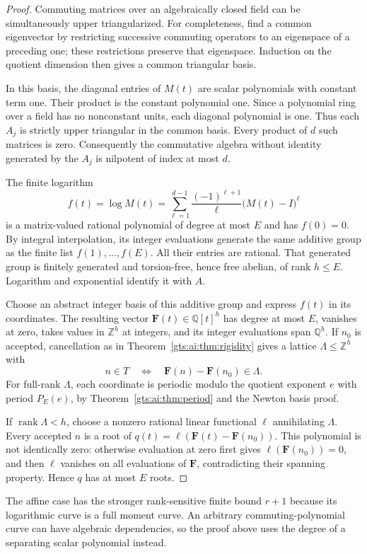 \documentclass[11pt,letterpaper]{article}
\theoremstyle{definition}
\theoremstyle{remark}
\newcommand{\Z}{\mathbb Z}
\newcommand{\rank}{\operatorname{rank}}
\newcommand{\Q}{\mathbb Q}
\begin{document}
\begin{proof}
Commuting matrices over an algebraically closed field can be simultaneously upper triangularized. For completeness, find a common eigenvector by restricting successive commuting operators to an eigenspace of a preceding one; these restrictions preserve that eigenspace. Induction on the quotient dimension then gives a common triangular basis.

In this basis, the diagonal entries of $M(t)$ are scalar polynomials with constant term one. Their product is the constant polynomial one. Since a polynomial ring over a field has no nonconstant units, each diagonal polynomial is one. Thus each $A_j$ is strictly upper triangular in the common basis. Every product of $d$ such matrices is zero. Consequently the commutative algebra without identity generated by the $A_j$ is nilpotent of index at most $d$.

The finite logarithm
\[
 f(t)=\log M(t)=\sum_{\ell=1}^{d-1}
 \frac{(-1)^{\ell+1}}\ell\bigl(M(t)-I\bigr)^\ell
\]
is a matrix-valued rational polynomial of degree at most $E$ and has $f(0)=0$. By integral interpolation, its integer evaluations generate the same additive group as the finite list $f(1),\ldots,f(E)$. All their entries are rational. That generated group is finitely generated and torsion-free, hence free abelian, of rank $h\le E$. Logarithm and exponential identify it with $A$.

Choose an abstract integer basis of this additive group and express $f(t)$ in its coordinates. The resulting vector $\mathbf F(t)\in\Q[t]^h$ has degree at most $E$, vanishes at zero, takes values in $\Z^h$ at integers, and its integer evaluations span $\Q^h$. If $n_0$ is accepted, cancellation as in Theorem~\ref{gts:ai:thm:rigidity} gives a lattice $\Lambda\le\Z^h$ with
\[
 n\in T\quad\Longleftrightarrow\quad
 \mathbf F(n)-\mathbf F(n_0)\in\Lambda.
\]
For full-rank $\Lambda$, each coordinate is periodic modulo the quotient exponent $e$ with period $P_E(e)$, by Theorem~\ref{gts:ai:thm:period} and the Newton basis proof.

If $\rank\Lambda<h$, choose a nonzero rational linear functional $\ell$ annihilating $\Lambda$. Every accepted $n$ is a root of
$q(t)=\ell(\mathbf F(t)-\mathbf F(n_0))$. This polynomial is not identically zero: otherwise evaluation at zero first gives $\ell(\mathbf F(n_0))=0$, and then $\ell$ vanishes on all evaluations of $\mathbf F$, contradicting their spanning property. Hence $q$ has at most $E$ roots.
\end{proof}
The affine case has the stronger rank-sensitive finite bound $r+1$ because its logarithmic curve is a full moment curve. An arbitrary commuting-polynomial curve can have algebraic dependencies, so the proof above uses the degree of a separating scalar polynomial instead.
\end{document}
